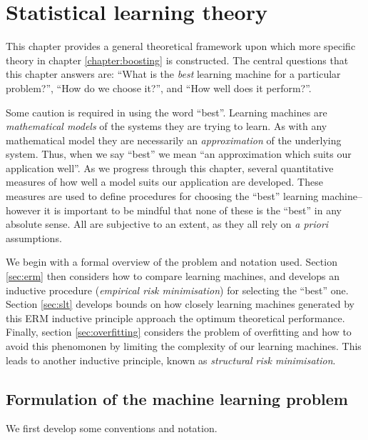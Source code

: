 
\chapter{Statistical learning theory}
\label{chapter:slt}

This chapter provides a general theoretical framework upon which more
specific theory in chapter \ref{chapter:boosting} is constructed.  The
central questions that this chapter answers are: ``What is the
\emph{best} learning machine for a particular problem?'', ``How do we
choose it?'', and ``How well does it perform?''.

Some caution is required in using the word ``best''.  Learning
machines are \emph{mathematical models} of the systems they are trying
to learn.  As with any mathematical model they are necessarily an
\emph{approximation} of the underlying system.  Thus, when we say
``best'' we mean ``an approximation which suits our application
well''.  As we progress through this chapter, several quantitative
measures of how well a model suits our application are developed.
These measures are used to define procedures for choosing the ``best''
learning machine--however it is important to be mindful that none of
these is the ``best'' in any absolute sense.  All are subjective to an
extent, as they all rely on \emph{a priori} assumptions.

We begin with a formal overview of the problem and notation used.
Section \ref{sec:erm} then considers how to compare learning machines,
and develops an inductive procedure (\emph{empirical risk
minimisation}) for selecting the ``best'' one.  Section \ref{sec:slt}
develops bounds on how closely learning machines generated by this ERM
inductive principle approach the optimum theoretical performance.
Finally, section \ref{sec:overfitting} considers the problem of
overfitting and how to avoid this phenomonen by limiting the
complexity of our learning machines.  This leads to another inductive
principle, known as \emph{structural risk minimisation}.


\section{Formulation of the machine learning problem}
\label{sec:formulation}

We first develop some conventions and notation.

